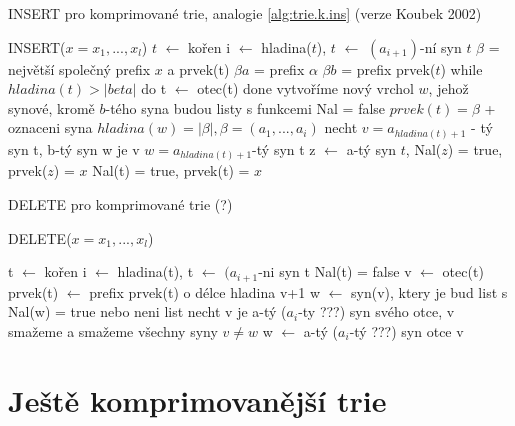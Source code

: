 
\begin{algorithm}[!htb]
	\caption{INSERT pro komprimované trie, analogie \ref{alg:trie.k.ins} (verze Koubek 2002)}
\label{alg:trie.k.ins_unk}
\begin{algorithmic}
\STATE INSERT($x=x_1, ..., x_l$)
\STATE $t$ $\leftarrow$ kořen
  \STATE i $\leftarrow$ hladina($t$), $t$ $\leftarrow$ $(a_{i+1})$-ní syn $t$
\ENDWHILE
{}
  \STATE $\beta$ = největší společný prefix $x$ a prvek(t)
  \STATE $\beta a$ = prefix $\alpha$
  \STATE $\beta b$ = prefix prvek($t$)
  \STATE while $hladina(t) > |beta|$ do t $\leftarrow$ otec(t) done
    \STATE vytvoříme nový vrchol $w$, jehož synové, kromě $b$-tého syna budou listy s
    \STATE funkcemi Nal = false
    \STATE $prvek(t) = \beta$ + oznaceni syna
    \STATE $hladina(w) = |\beta|, \beta = (a_1, ..., a_i)$
    \STATE necht $v = a_{hladina(t) + 1}$ - tý syn t, b-tý syn w je v
    \STATE $w = a_{hladina(t)+1}$-tý syn t
  \ENDIF
  \STATE z $\leftarrow$ a-tý syn $t$, Nal($z$) = true, prvek($z$) = $x$
\ELSE
  \STATE Nal(t) = true, prvek(t) = $x$
\ENDIF
\end{algorithmic}
\end{algorithm}


\begin{algorithm}[!htb]
\caption{DELETE pro komprimované trie (?)}
\label{alg:trie.k.del_unk}
DELETE($x=x_1, ..., x_l$)
\begin{algorithmic}
\STATE t $\leftarrow$ kořen
  \STATE i $\leftarrow$ hladina(t), t $\leftarrow$ $(a_{i+1}$-ni syn t
\ENDWHILE
{} 
  \STATE Nal(t) = false
  \STATE v $\leftarrow$ otec(t)
  \STATE prvek(t) $\leftarrow$ prefix prvek(t) o délce hladina v+1
    \STATE w $\leftarrow$ syn(v), ktery je bud list s Nal(w) = true nebo neni list
    \STATE necht v je a-tý ($a_i$-ty ???) syn svého otce, v smažeme a smažeme
    \STATE všechny syny $v \neq w$
    \STATE w $\leftarrow$ a-tý ($a_i$-tý ???) syn otce v
  \ENDIF
\ENDIF
\end{algorithmic}
\end{algorithm}


\section{Ještě komprimovanější trie}

